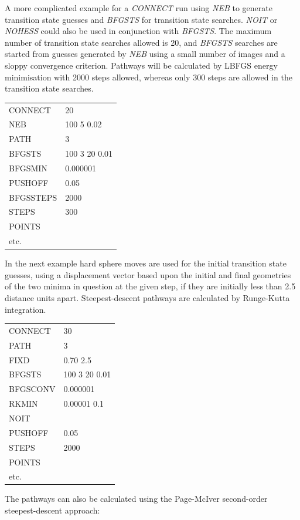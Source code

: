 \documentclass[12pt,a4paper,dvips]{article}
\begin{document}
\noindent A more complicated example for a {\it CONNECT\/} run using {\it NEB\/} to generate transition
state guesses and {\it BFGSTS\/} for transition state searches. {\it NOIT\/}  or 
{\it NOHESS} could also be used in conjunction with {\it BFGSTS\/}. The maximum number of 
transition state searches allowed is 20, and {\it BFGSTS\/} searches are started from 
guesses generated by {\it NEB\/} using a small number of images and a sloppy convergence
criterion. Pathways will be calculated by LBFGS energy minimisation with 2000 steps allowed, 
whereas only 300 steps are allowed in the transition state searches.

\medskip
\begin{tabular}{ll}
CONNECT &  20 \\
NEB     &  100 5 0.02 \\
PATH    &  3 \\
BFGSTS  &  100 3 20 0.01  \\
BFGSMIN & 0.000001 \\
PUSHOFF  & 0.05 \\
BFGSSTEPS & 2000 \\
STEPS     & 300 \\
POINTS & \\
etc. & \\
\end{tabular}

\noindent In the next example hard sphere moves are used for the initial transition state guesses, using a 
displacement vector based upon the initial and final geometries of the two minima in question 
at the given step, if they are initially less than 2.5 distance units
apart. Steepest-descent pathways are calculated by Runge-Kutta integration.

\medskip
\begin{tabular}{ll}
CONNECT & 30 \\
PATH   &  3 \\
FIXD & 0.70 2.5 \\
BFGSTS  & 100 3 20 0.01 \\
BFGSCONV & 0.000001 \\
RKMIN & 0.00001 0.1 \\
NOIT & \\
PUSHOFF & 0.05 \\
STEPS     & 2000 \\
POINTS & \\
etc. & \\
\end{tabular}

\noindent The pathways can also be calculated using the Page-McIver second-order steepest-descent approach:
\end{document}

